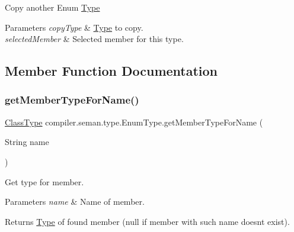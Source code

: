 Copy another Enum \hyperlink{classcompiler_1_1seman_1_1type_1_1_type}{Type} 
\begin{DoxyParams}{Parameters}
{\em copy\+Type} & \hyperlink{classcompiler_1_1seman_1_1type_1_1_type}{Type} to copy. \\
\hline
{\em selected\+Member} & Selected member for this type. \\
\hline
\end{DoxyParams}


\subsection{Member Function Documentation}
\mbox{\label{classcompiler_1_1seman_1_1type_1_1_enum_type_ae95232173956bde3df8ef9f9022a31ff}} 
\subsubsection{\texorpdfstring{get\+Member\+Type\+For\+Name()}{getMemberTypeForName()}}
{\footnotesize\ttfamily \hyperlink{classcompiler_1_1seman_1_1type_1_1_class_type}{Class\+Type} compiler.\+seman.\+type.\+Enum\+Type.\+get\+Member\+Type\+For\+Name (\begin{DoxyParamCaption}\item[{String}]{name }\end{DoxyParamCaption})}

Get type for member. 
\begin{DoxyParams}{Parameters}
{\em name} & Name of member. \\
\hline
\end{DoxyParams}
\begin{DoxyReturn}{Returns}
\hyperlink{classcompiler_1_1seman_1_1type_1_1_type}{Type} of found member (null if member with such name doesn\textquotesingle{}t exist). 
\end{DoxyReturn}
\mbox{\label{classcompiler_1_1seman_1_1type_1_1_enum_type_a903e0511a0b519220354690f2ca0867e}} 
